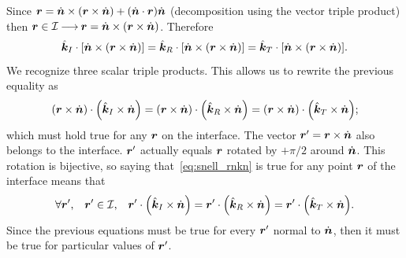Since
$
    \bm{r} =
    \dot{\bm{n}} \times (\bm{r} \times \dot{\bm{n}}) +
    (\dot{\bm{n}} \cdot \bm{r}) \dot{\bm{n}}
$
(decomposition using the vector triple product) then
$
    \bm{r} \in \mathcal{I}
    \mathbin{\longrightarrow}
    \bm{r} = \dot{\bm{n}} \times (\bm{r} \times \dot{\bm{n}})
$.
Therefore
\begin{equation}
    \hat{\bm{k}}_I \cdot [\dot{\bm{n}} \times (\bm{r} \times \dot{\bm{n}})]
    =
    \hat{\bm{k}}_R \cdot [\dot{\bm{n}} \times (\bm{r} \times \dot{\bm{n}})]
    =
    \hat{\bm{k}}_T \cdot [\dot{\bm{n}} \times (\bm{r} \times \dot{\bm{n}})]
    \text{.}
\end{equation}
We recognize three scalar triple products.
This allows us to rewrite the previous equality as
\begin{equation}
    (\vect{r} \times \vectu{n}) \cdot \left(\vectcp{k}_\I \times \vectu{n}\right)
    =
    (\vect{r} \times \vectu{n}) \cdot \left(\vectcp{k}_\R \times \vectu{n}\right)
    =
    (\vect{r} \times \vectu{n}) \cdot \left(\vectcp{k}_\T \times \vectu{n}\right)
    \text{;}
    \label{eq:snell_rnkn}
\end{equation}
which must hold true for any $\bm{r}$ on the interface.
The vector $\bm{r}' = \bm{r} \times \dot{\bm{n}}$ also belongs to the interface.
$\bm{r}'$ actually equals $\bm{r}$ rotated by $+\pi/2$ around $\dot{\bm{n}}$.
This rotation is bijective, so saying that~\cref{eq:snell_rnkn} is true for any point $\bm{r}$ of the interface means that
\begin{equation}
    \forall \vect{r}'\text{,}\quad
    \vect{r}' \in \mathcal{I}\text{,}\quad
    \vect{r}' \cdot \left(\vectcp{k}_\I \times \vectu{n}\right)
    =
    \vect{r}' \cdot \left(\vectcp{k}_\R \times \vectu{n}\right)
    =
    \vect{r}' \cdot \left(\vectcp{k}_\T \times \vectu{n}\right)
    \text{.}
    \label{eq:snell_rkn}
\end{equation}
Since the previous equations must be true for every $\bm{r}'$ normal to $\dot{\bm{n}}$,
then it must be true for particular values of $\bm{r}'$.

